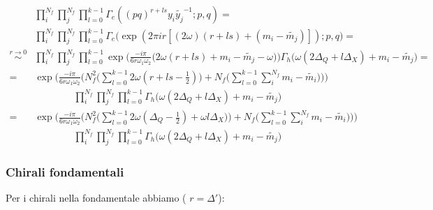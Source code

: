 \documentclass[a4paper,12pt]{article}
\begin{document}
\begin{align*}
&\prod_i^{N_f} \prod_j^{N_f}  \prod_{l=0}^{k-1} \Gamma_e ( (pq)^{r + l s} y_i \tilde{y_j}^{-1}; p ,q)  = \\
& \prod_i^{N_f} \prod_j^{N_f}  \prod_{l=0}^{k-1} \Gamma_e \big ( \exp( 2 \pi i r [(2 \omega)(r + l s) +  ( m_i - \tilde{m_j})]); p ,q \big)  = \\
\overset{ r\rightarrow 0 }{ \sim } &  \prod_i^{N_f} \prod_j^{N_f}  \prod_{l=0}^{k-1} \exp \bigg( \frac{- i \pi }{6 r \omega_1 \omega_2} \big( 2 \omega ( r + l s ) + m_i - \tilde{m_j} - \omega \big) \bigg) \Gamma_h \big( \omega ( 2 \Delta_Q + l \Delta_X) + m_i - \tilde{m_j} \big)   = \\
= &  \exp \bigg( \frac{- i \pi }{6 r \omega_1 \omega_2} \big(  N_f^2  \bigg( \sum _{l=0}^{k-1} 2 \omega ( r + l s - \frac{1}{2}  )\bigg)  +N_f \big( \sum_{l=0}^{k-1} \sum_i^{N_f} m_i - \tilde{m_i}\big) \big) \bigg) \\
&\qquad \qquad  \prod_i^{N_f} \prod_j^{N_f}  \prod_{l=0}^{k-1}  \Gamma_h \big( \omega ( 2 \Delta_Q + l  \Delta_X) + m_i -  \tilde{m_j} \big)  \\
= &  \exp \bigg( \frac{- i \pi }{6 r \omega_1 \omega_2} \big(  N_f^2  \bigg( \sum _{l=0}^{k-1} 2 \omega ( \Delta_Q - \frac{1}{2}) + \omega l \Delta_X   )\bigg)  +N_f \big( \sum_{l=0}^{k-1} \sum_i^{N_f} m_i - \tilde{m_i}\big) \big) \bigg) \\
&\qquad \qquad  \prod_i^{N_f} \prod_j^{N_f}  \prod_{l=0}^{k-1}  \Gamma_h \big( \omega ( 2 \Delta_Q + l \Delta_X) + m_i - \tilde{m_j} \big)
\end{align*}

\subsubsection*{Chirali fondamentali}
Per i chirali nella fondamentale abbiamo ( $r = \Delta'$):
\end{document}
